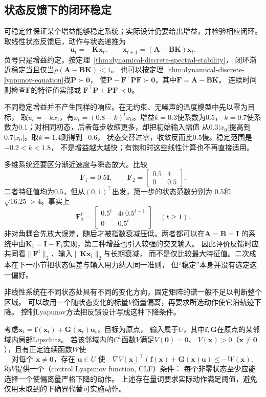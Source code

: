 \subsection{状态反馈下的闭环稳定}
\label{sec:control-state-feedback-stability}
可稳定性保证某个增益能够稳定系统；实际设计仍要给出增益，并检验相应闭环。
取线性状态反馈后，动作与状态递推为
\begin{equation}
  \bm u_t=-\bm K\bm x_t,
  \qquad \bm x_{t+1}=(\bm A-\bm B\bm K)\bm x_t.
  \label{eq:control-state-feedback}
\end{equation}
负号只是增益约定。按定理~\ref{thm:dynamical-discrete-spectral-stability}，
闭环渐近稳定当且仅当$\rho(\bm A-\bm B\bm K)<1$。
也可以按定理~\ref{thm:dynamical-discrete-lyapunov-equation}找$\bm P\succ\bm0$，
使$\bm P-\bm F^\top\bm P\bm F\succ\bm0$，其中$\bm F=\bm A-\bm B\bm K$。
连续时间则检查$\bm F$的特征值实部或
$\bm F^\top\bm P+\bm P\bm F\prec\bm0$。

不同稳定增益并不产生同样的响应。在无约束、无噪声的温度模型中先以零为目标，
取$u_t=-kx_t$，有$x_t=(0.8-k)^t x_0$。增益$k=0.3$使系数为$0.5$，
$k=0.7$使系数为$0.1$；对相同初态，后者每步收缩更多，却把初始输入幅值
从$0.3|x_0|$提高到$0.7|x_0|$。取$k=1.4$则得到$-0.6$，
状态交替过零，收敛反而比$0.5$慢。稳定范围是$-0.2<k<1.8$，
不是增益越大越快；有饱和时这些线性计算也不再直接适用。

多维系统还要区分渐近速度与瞬态放大。比较
\[
  \bm F_1=0.5\bm I,\qquad
  \bm F_2=\begin{bmatrix}0.5&4\\0&0.5\end{bmatrix}.
\]
二者特征值均为$0.5$，但从$(0,1)^\top$出发，第一步的状态范数分别为
$0.5$和$\sqrt{16.25}>4$。事实上
\[
  \bm F_2^t=
  \begin{bmatrix}0.5^t&4t\,0.5^{t-1}\\0&0.5^t\end{bmatrix}
  \quad(t\geq1).
\]
非对角耦合先放大误差，随后才被指数衰减压低。两者都可以在$\bm A=\bm B=\bm I$
的系统中由$\bm K_i=\bm I-\bm F_i$实现，第二种增益也引入较强的交叉输入。
因此评价反馈时应共同看$\|\bm F^t\|_2$、输入$\|\bm K\bm x_t\|_2$与长期衰减，
而不是仅比较最大特征值。二次成本在下一小节把状态偏差与输入用力纳入同一准则，
但“稳定”本身并没有选定这一偏好。

非线性系统在不同状态处具有不同的变化方向，固定矩阵的谱一般不足以判断整个区域。
可以改用一个随状态变化的标量$V$衡量偏离，再要求所选动作使它沿轨迹下降。
控制Lyapunov方法把反馈设计写成这种下降条件。
\begin{definition}[控制Lyapunov函数条件]
\label{def:control-clf}
考虑$\dot{\bm x}_t=\bm f(\bm x_t)+\bm G(\bm x_t)\bm u_t$，目标为原点，
输入属于$U$，其中$\bm f,\bm G$在原点的某邻域内局部Lipschitz。
若该邻域内的$C^1$函数$V$满足$V(\bm0)=0$、
$V(\bm x)>0$（$\bm x\neq\bm0$），且有正定连续函数$W$使
\[
  \text{对每个 }\bm x\neq\bm0\text{，存在 }\bm u\in U\text{ 使}
  \quad\nabla V(\bm x)^\top(\bm f(\bm x)+\bm G(\bm x)\bm u)
  \leq-W(\bm x),
\]
称$V$提供一个（control Lyapunov function, CLF）条件：
每个非零状态至少应能选择一个使偏离量严格下降的动作。
上述存在量词要求实际动作满足阈值，避免仅用未取到的下确界代替可实施动作。
\end{definition}

